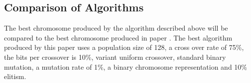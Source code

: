 \subsection{Comparison of Algorithms}

The best chromosome produced by the algorithm described above will be compared to the 
best chromosome produced in paper \cite*{peter}. The best algorithm produced by this paper 
uses a population size of 128, a cross over rate of 75\%, the bits per crossover is 10\%, 
variant uniform crossover, standard binary mutation, a mutation rate of 1\%, a binary chromosome 
representation and 10\% elitism.









